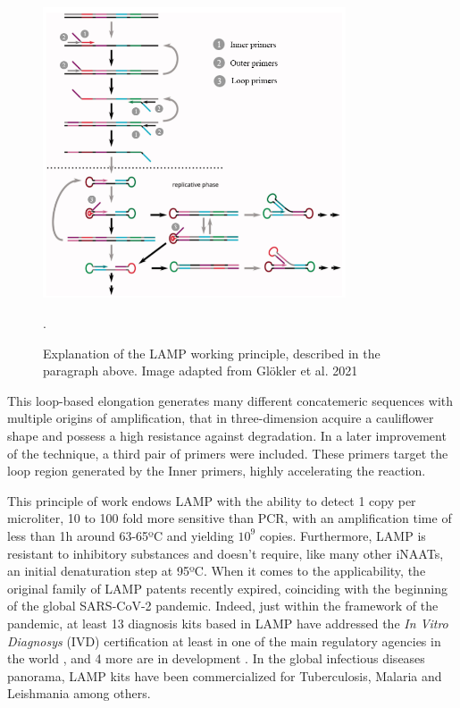 \begin{figure}[b]
    \centering
    \includegraphics[width=0.8\textwidth]{figures/lamp.png}
    \caption{Explanation of the LAMP working principle, described in the paragraph above. Image adapted from Glökler et al. 2021 \cite{glokler_isothermal_2021}}.
    \label{fig:LAMP}
\end{figure}

This loop-based elongation generates many different concatemeric sequences with multiple origins of amplification, that in three-dimension acquire a cauliflower shape and possess a high resistance against degradation. In a later improvement of the technique, a third pair of primers were included. These primers target the loop region generated by the Inner primers, highly accelerating the reaction\cite{nagamine_accelerated_2002}.

This principle of work endows LAMP with the ability to detect 1 copy per microliter\cite{zhang_lamp---chip_2019}, 10 to 100 fold more sensitive than PCR, with an amplification time of less than 1h around 63-65ºC and yielding $10^9$ copies\cite{notomi_loop-mediated_2000}. Furthermore, LAMP is resistant to inhibitory substances and doesn't require, like many other iNAATs, an initial denaturation step at 95ºC\cite{enomoto_rapid_2005}\cite{kaneko_tolerance_2007}.
When it comes to the applicability, the original family of LAMP patents recently expired\cite{tsugunori_notomi_hase_tetsu_process_2000}, coinciding with  the beginning of the global SARS-CoV-2 pandemic. Indeed, just within the framework of the pandemic, at least 13 diagnosis kits based in LAMP have addressed the \emph{In Vitro Diagnosys} (IVD) certification at least  in one of the main regulatory agencies in the world \cite{find_sars-cov-2_2022}, and 4 more are in development \cite{find_sars-cov-2_2022-1}. In the global infectious diseases panorama, LAMP kits have been commercialized for Tuberculosis, Malaria and Leishmania among others\cite{oliveira_isothermal_2021}. 

